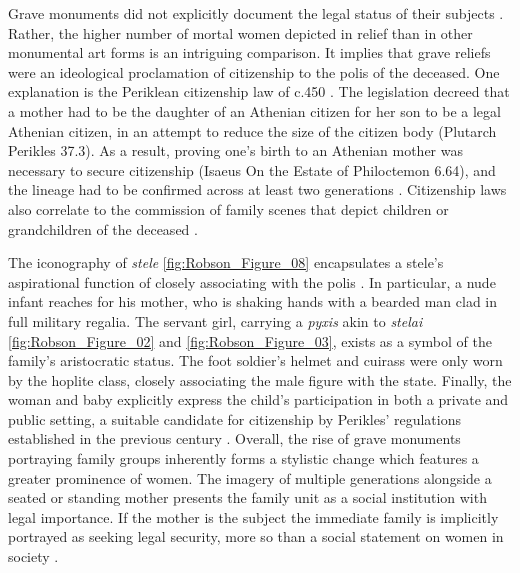 Grave monuments did not explicitly document the legal status of their subjects \parencite[651]{Closterman2007}.
Rather, the higher number of mortal women depicted in relief than in other monumental art forms is an intriguing comparison. It implies that grave reliefs were an ideological proclamation of citizenship to the polis of the deceased. One explanation is the Periklean citizenship law of c.450 \BC.
The legislation decreed that a mother had to be the daughter of an Athenian citizen for her son to be a legal Athenian citizen, in an attempt to reduce the size of the citizen body (Plutarch Perikles 37.3). As a result, proving one’s birth to an Athenian mother was necessary to secure citizenship (Isaeus On the Estate of Philoctemon 6.64), and the lineage had to be confirmed across at least two generations \parencite[24]{Burton2003}.
Citizenship laws also correlate to the commission of family scenes that depict children or grandchildren of the deceased \parencite[25]{Burton2003}.

The iconography of \textit{stele} \ref{fig:Robson_Figure_08} encapsulates a stele’s aspirational function of closely associating with the polis \parencite[126]{Pomeroy1997}.
In particular, a nude infant reaches for his mother, who is shaking hands with a bearded man clad in full military regalia. The servant girl, carrying a \textit{pyxis} akin to \textit{stelai} \ref{fig:Robson_Figure_02} and \ref{fig:Robson_Figure_03}, exists as a symbol of the family’s aristocratic status.
The foot soldier’s helmet and cuirass were only worn by the hoplite class, closely associating the male figure with the state. Finally, the woman and baby explicitly express the child’s participation in both a private and public setting, a suitable candidate for citizenship by Perikles' regulations established in the previous century \parencite[312]{Grossman2007}.
Overall, the rise of grave monuments portraying family groups inherently forms a stylistic change which features a greater prominence of women. The imagery of multiple generations alongside a seated or standing mother presents the family unit as a social institution with legal importance. If the mother is the subject the immediate family is implicitly portrayed as seeking legal security, more so than a social statement on women in society \parencite[60]{Boegehold1994}.


